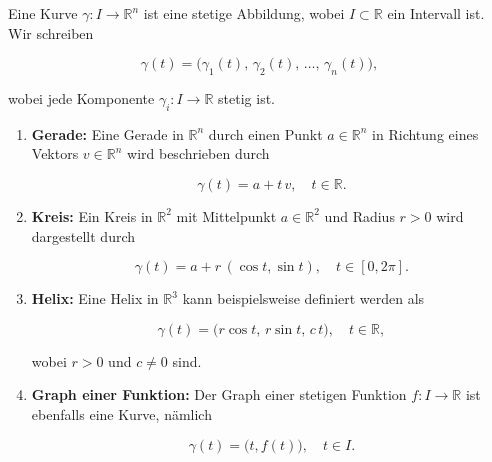 \begin{definition}{}{}
Eine Kurve $\gamma : I \to \mathbb{R}^n$ ist eine stetige Abbildung, wobei $I \subset \mathbb{R}$ ein Intervall ist.\\
Wir schreiben


$$
\gamma(t) = \bigl( \gamma_1(t),\, \gamma_2(t),\, \dots,\, \gamma_n(t) \bigr),
$$


wobei jede Komponente $\gamma_i : I \to \mathbb{R}$ stetig ist.
\end{definition}

\begin{beispielbox}
\begin{enumerate}
  \item \textbf{Gerade:} Eine Gerade in $\mathbb{R}^n$ durch einen Punkt $a \in \mathbb{R}^n$ in Richtung eines Vektors $v \in \mathbb{R}^n$ wird beschrieben durch
  

$$
  \gamma(t) = a + t\,v, \quad t \in \mathbb{R}.
  $$


  
  \item \textbf{Kreis:} Ein Kreis in $\mathbb{R}^2$ mit Mittelpunkt $a \in \mathbb{R}^2$ und Radius $r > 0$ wird dargestellt durch
  

$$
  \gamma(t) = a + r\,(\cos t, \sin t), \quad t \in [0, 2\pi].
  $$


  
  \item \textbf{Helix:} Eine Helix in $\mathbb{R}^3$ kann beispielsweise definiert werden als
  

$$
  \gamma(t) = \bigl( r\cos t,\, r\sin t,\, c\,t \bigr), \quad t \in \mathbb{R},
  $$


  wobei $r > 0$ und $c \neq 0$ sind.
  
  \item \textbf{Graph einer Funktion:} Der Graph einer stetigen Funktion $f : I \to \mathbb{R}$ ist ebenfalls eine Kurve, nämlich
  

$$
  \gamma(t) = \bigl( t, f(t) \bigr), \quad t \in I.
  $$


\end{enumerate}
\end{beispielbox}